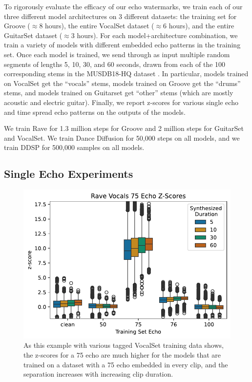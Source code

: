 \documentclass[letterpaper]{article} %
\begin{document}
To rigorously evaluate the efficacy of our echo watermarks, we train each of our three different model architectures on 3 different datasets:  the training set for Groove \cite{groove2019} ($\approx$8 hours), the entire VocalSet dataset \cite{wilkins2018vocalset} ($\approx$6 hours), and the entire GuitarSet dataset \cite{xi2018guitarset} ($\approx$3 hours).  For each model+architecture combination, we train a variety of models with different embedded echo patterns in the training set.  Once each model is trained, we send through as input multiple random segments of lengths 5, 10, 30, and 60 seconds, drawn from each of the 100 corresponding stems in the MUSDB18-HQ dataset \cite{musdb18-hq}.  In particular, models trained on VocalSet get the ``vocals'' stems, models trained on Groove get the ``drums'' stems, and models trained on Guitarset get ``other'' stems (which are mostly acoustic and electric guitar).  Finally, we report z-scores for various single echo and time spread echo patterns on the outputs of the models.

We train Rave for 1.3 million steps for Groove and 2 million steps for GuitarSet and VocalSet.  We train Dance Diffusion for 50,000 steps on all models, and we train DDSP for 500,000 samples on all models.

\subsection{Single Echo Experiments}
\label{sec:experimentssingleecho}


\begin{figure}
    \centering
    \includegraphics[width=\columnwidth]{figs/RaveZScoreExamples.pdf}
    \caption{As this example with various tagged VocalSet training data shows, the z-scores for a 75 echo are much higher for the models that are trained on a dataset with a 75 echo embedded in every clip, and the separation increases with increasing clip duration.}
    \label{fig:ravezscoreexamples}
\end{figure}
\end{document}
